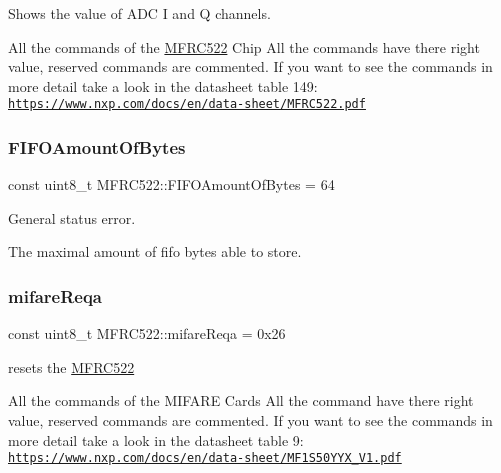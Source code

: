 Shows the value of A\+DC I and Q channels. 

All the commands of the \hyperlink{classMFRC522}{M\+F\+R\+C522} Chip  All the commands have there right value, reserved commands are commented. If you want to see the commands in more detail take a look in the datasheet table 149\+: \href{https://www.nxp.com/docs/en/data-sheet/MFRC522.pdf}{\tt https\+://www.\+nxp.\+com/docs/en/data-\/sheet/\+M\+F\+R\+C522.\+pdf} \mbox{\label{classMFRC522_a56c8309a003cf1a5d8479c7783826f8e}} 
\subsubsection{\texorpdfstring{F\+I\+F\+O\+Amount\+Of\+Bytes}{FIFOAmountOfBytes}}
{\footnotesize\ttfamily const uint8\+\_\+t M\+F\+R\+C522\+::\+F\+I\+F\+O\+Amount\+Of\+Bytes = 64}



General status error. 

The maximal amount of fifo bytes able to store. \mbox{\label{classMFRC522_a8e438d50133c5a2a106e9bdbdeeb19ec}} 
\subsubsection{\texorpdfstring{mifare\+Reqa}{mifareReqa}}
{\footnotesize\ttfamily const uint8\+\_\+t M\+F\+R\+C522\+::mifare\+Reqa = 0x26\hspace{0.3cm}{\ttfamily [static]}}



resets the \hyperlink{classMFRC522}{M\+F\+R\+C522} 

All the commands of the M\+I\+F\+A\+RE Cards  All the command have there right value, reserved commands are commented. If you want to see the commands in more detail take a look in the datasheet table 9\+: \href{https://www.nxp.com/docs/en/data-sheet/MF1S50YYX_V1.pdf}{\tt https\+://www.\+nxp.\+com/docs/en/data-\/sheet/\+M\+F1\+S50\+Y\+Y\+X\+\_\+\+V1.\+pdf} \mbox{\label{classMFRC522_a7d19c9869a7fbbe0d9825d5653d6af7b}} 
